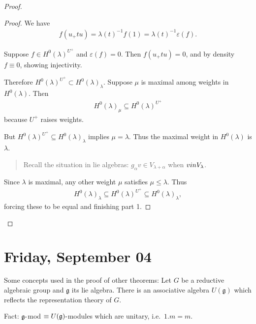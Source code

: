 \begin{proof}

\begin{proof}

We have
\begin{align*}   f(u_+ t u) = \lambda(t)^{-1} f(1) = \lambda(t)^{-1} \varepsilon(f) .\end{align*}

Suppose \(f\in H^0(\lambda)^{U^+}\) and \(\varepsilon(f) = 0\). Then
\(f(u_+ t u) = 0\), and by density \(f\equiv 0\), showing injectivity.

Therefore \(H^0(\lambda)^{U^+}\subset H^0(\lambda)_\lambda\). Suppose
\(\mu\) is maximal among weights in \(H^0(\lambda)\). Then
\begin{align*}   H^0(\lambda)_{\mu} \subseteq H^0(\lambda)^{U^+} \end{align*}
because \(U^+\) raises weights.

But \(H^0(\lambda)^{U^+} \subseteq H^0(\lambda)_\lambda\) implies
\(\mu = \lambda\). Thus the maximal weight in \(H^0(\lambda)\) is
\(\lambda\).

\begin{quote}
Recall the situation in lie algebras:
\(g_\alpha v \in V_{\lambda + \alpha}\) when \(v\\in V_{\lambda}\).
\end{quote}

Since \(\lambda\) is maximal, any other weight \(\mu\) satisfies
\(\mu \leq \lambda\). Thus
\begin{align*}   H^0(\lambda)_\lambda \subseteq H^0(\lambda)^{U^+} \subseteq H^0(\lambda)_\lambda ,\end{align*}
forcing these to be equal and finishing part 1.

\end{proof}

\end{proof}

\hypertarget{friday-september-04}{%
\section{Friday, September 04}\label{friday-september-04}}

Some concepts used in the proof of other theorems: Let \(G\) be a
reductive algebraic group and \({\mathfrak{g}}\) its lie algebra. There
is an associative algebra \(U({\mathfrak{g}})\) which reflects the
representation theory of \(G\).

Fact: \({\mathfrak{g}}{\hbox{-}}\)mod
\(\equiv U({\mathfrak{g}}){\hbox{-}}\)modules which are unitary,
i.e.~\(1.m = m\).

